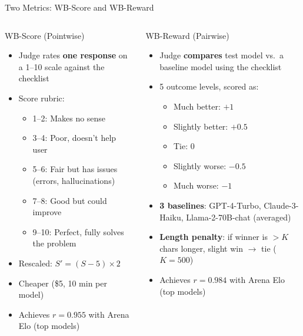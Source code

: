 \documentclass[aspectratio=169,11pt]{beamer}
\begin{document}
\begin{frame}{Two Metrics: WB-Score and WB-Reward}

\begin{columns}[T]
\begin{column}{0.48\textwidth}
\begin{block}{WB-Score (Pointwise)}
\begin{itemize}\small
    \item Judge rates \textbf{one response} on a 1--10 scale against the checklist
    \item Score rubric:
    \begin{itemize}\scriptsize
        \item 1--2: Makes no sense
        \item 3--4: Poor, doesn't help user
        \item 5--6: Fair but has issues (errors, hallucinations)
        \item 7--8: Good but could improve
        \item 9--10: Perfect, fully solves the problem
    \end{itemize}
    \item Rescaled: $S' = (S - 5) \times 2$
    \item Cheaper (\$5, 10 min per model)
    \item Achieves $r = 0.955$ with Arena Elo (top models)
\end{itemize}
\end{block}
\end{column}

\begin{column}{0.48\textwidth}
\begin{block}{WB-Reward (Pairwise)}
\begin{itemize}\small
    \item Judge \textbf{compares} test model vs.\ a baseline model using the checklist
    \item 5 outcome levels, scored as:
    \begin{itemize}\scriptsize
        \item Much better: $+1$
        \item Slightly better: $+0.5$
        \item Tie: $0$
        \item Slightly worse: $-0.5$
        \item Much worse: $-1$
    \end{itemize}
    \item \textbf{3 baselines}: GPT-4-Turbo, Claude-3-Haiku, Llama-2-70B-chat (averaged)
    \item \textbf{Length penalty}: if winner is $>K$ chars longer, slight win $\to$ tie ($K=500$)
    \item Achieves $r = 0.984$ with Arena Elo (top models)
\end{itemize}
\end{block}
\end{column}
\end{columns}
\end{frame}
\end{document}

